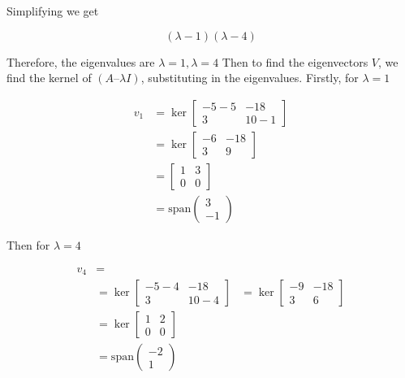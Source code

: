 \documentclass{article}
\begin{document}
Simplifying we get

\begin{equation*}
    (\lambda - 1) (\lambda - 4)
\end{equation*}

Therefore, the eigenvalues are $ \lambda = 1, \lambda = 4 $
Then to find the eigenvectors $ V $, we find the kernel of $ (A – \lambda I) $, substituting in the eigenvalues. 
Firstly, for $ \lambda = 1 $

\begin{align*}
    v_{1} 
    &= \ker\begin{bmatrix}
        -5-5 & -18 \\ 3 & 10-1
    \end{bmatrix}\\
    &= \ker \begin{bmatrix}
        -6 & -18 \\ 3 & 9
    \end{bmatrix}\\
    &= \begin{bmatrix}
        1 & 3 \\ 0 & 0
    \end{bmatrix}\\
    &= \text{span}  
    \begin{pmatrix}
        3 \\ -1
    \end{pmatrix}
\end{align*}

Then for $ \lambda = 4 $

\begin{align*}
    v_{4} &= \\
    &= \ker \begin{bmatrix}
        -5-4 & -18 \\ 3 & 10-4
    \end{bmatrix}
    &= \ker \begin{bmatrix}
        -9 & -18 \\ 3 & 6
    \end{bmatrix} \\
    &=
    \ker\begin{bmatrix}
        1 & 2 \\ 0 & 0
    \end{bmatrix} \\
    &= \text{span} \begin{pmatrix}
        -2 \\ 1
    \end{pmatrix}
\end{align*}
\end{document}
